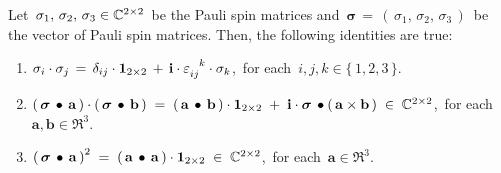 \vskip 0.5cm
\begin{lemma}
\label{PauliMatricesProperties}
\mbox{}
\vskip 0.1cm
\noindent
Let
\,$\sigma_{1},\,\sigma_{2},\,\sigma_{3} \in \mathbb{C}^{2 \times 2}$\,
be the Pauli spin matrices and
\,$\boldsymbol{\sigma} \,=\, \left(\,\sigma_{1},\,\sigma_{2},\,\sigma_{3}\,\right)$\,
be the vector of Pauli spin matrices.
Then, the following identities are true:
\begin{enumerate}
\item
    $
    \sigma_{i} \cdot \sigma_{j}
    \, = \,
        \delta_{ij}\cdot\boldsymbol{1}_{2 \times 2}
        \, + \,
        \i\cdot\varepsilon_{ij{\color{white}k}}^{{\color{white}ij}k}\cdot\sigma_{k}
    $,\,
    for each
    \,$i,j,k \in \{\,1,2,3\,\}$.\,
\item
    $
    \left(\,\boldsymbol{\sigma} \,\bullet\, \mathbf{a}\,\right)
    \cdot
    \left(\,\boldsymbol{\sigma} \,\bullet\, \mathbf{b}\,\right)
    \; = \;
        \left(\,\mathbf{a}\,\bullet\,\mathbf{b}\,\right)\cdot\boldsymbol{1}_{2 \times 2}
        \; + \;
        \mathbf{i}\cdot\boldsymbol{\sigma} \,\bullet \left(\,\mathbf{a} \times \mathbf{b}\,\right)
    \; \in \;
        \mathbb{C}^{2 \times 2}
    $,\,
    for each
    \,$\mathbf{a}, \mathbf{b} \in \Re^{3}$.\,
\item
    $
    \left(\,\boldsymbol{\sigma} \,\bullet\, \mathbf{a}\,\right)^{2}
    \; = \;
        (\,\mathbf{a} \,\bullet\, \mathbf{a}\,)\cdot\boldsymbol{1}_{2 \times 2}
    \; \in \;
        \mathbb{C}^{2 \times 2}
    $,\,
    for each
    \,$\mathbf{a} \in \Re^{3}$.\,
\end{enumerate}
\end{lemma}
\proof
